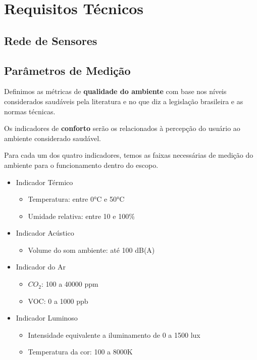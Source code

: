 \documentclass[../monografia.tex]{subfiles}
\begin{document}
\section{Requisitos Técnicos}

\subsection{Rede de Sensores}

\subsection{Parâmetros de Medição}

Definimos as métricas de \textbf{qualidade do ambiente} com base nos níveis considerados saudáveis pela literatura e no que diz a legislação brasileira e as normas técnicas.

Os indicadores de \textbf{conforto} serão os relacionados à percepção do usuário ao ambiente considerado saudável. 

Para cada um dos quatro indicadores, temos as faixas necessárias de medição do ambiente para o funcionamento dentro do escopo.

\begin{itemize}
	\item Indicador Térmico
	\begin{itemize}
		\item Temperatura: entre 0°C e 50°C
		\item Umidade relativa: entre 10 e 100\%
	\end{itemize}
	\item Indicador Acústico
	\begin{itemize}
		\item Volume do som ambiente: até 100 dB(A)
	\end{itemize} 
	\item Indicador do Ar
	\begin{itemize}
		\item $CO_{2}$: 100 a 40000 ppm
		\item VOC: 0 a 1000 ppb
	\end{itemize} 
	\item Indicador Luminoso
	\begin{itemize}
		\item Intensidade equivalente a iluminamento de 0 a 1500 lux
		\item Temperatura da cor: 100 a 8000K
	\end{itemize} 

\end{itemize}
\end{document}
